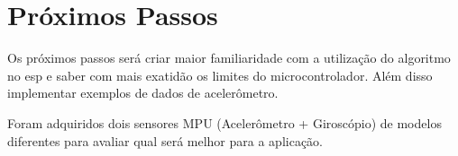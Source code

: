 \section{Próximos Passos}

Os próximos passos será criar maior familiaridade com a utilização do algoritmo no esp e saber com mais exatidão os limites do microcontrolador.
Além disso implementar exemplos de dados de acelerômetro.

Foram adquiridos dois sensores MPU (Acelerômetro + Giroscópio) de modelos diferentes para avaliar qual será
melhor para a aplicação.
